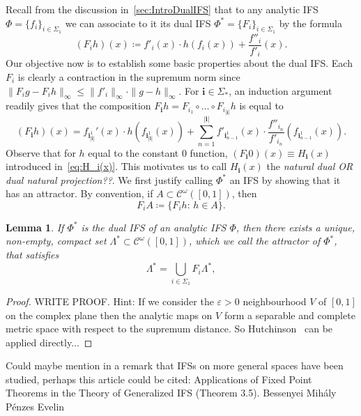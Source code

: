 \documentclass[12pt,]{article}
\newtheorem{lemma}[theorem]{Lemma}
\theoremstyle{definition}
\theoremstyle{remark}
\newcommand{\0}{\mathbf{0}}
\newcommand{\bi}{\mathbf{i}}
\begin{document}
{Recall from the discussion in~\cref{sec:IntroDualIFS} that to any analytic IFS $\Phi=\{f_i\}_{i\in\Sigma_1}$ we can associate to it its dual IFS $\Phi^*=\{F_i\}_{i\in\Sigma_1}$ by the formula
\begin{equation}\label{eq:LiftedIFS}
	(F_i h)(x)\coloneqq f'_i(x)\cdot h(f_i(x)) + \frac{f''_i}{f'_i}(x).
\end{equation}
Our objective now is to establish some basic properties about the dual IFS. Each $F_i$ is clearly a contraction in the supremum norm since $\|F_ig-F_ih\|_{\infty}\leq \|f'_i\|_{\infty}\cdot \|g-h\|_{\infty}$. For $\bi\in\Sigma_*$, an induction argument readily gives that the composition $F_{\bi}h=F_{i_1}\circ\ldots\circ F_{i_{|\bi|}}h$ is equal to
\begin{equation}\label{eq:IteratesLiftedIFS}
	(F_{\bi}h)(x) = f_{\bi_{|\bi|}^1}'(x)\cdot h(f_{\bi_{|\bi|}^1}(x)) + \sum_{n=1}^{|\bi|} f'_{\bi_{n-1}^1}(x) \cdot 
	\frac{f''_{i_n}}{f'_{i_n}}(f_{\bi_{n-1}^1}(x)).
\end{equation}
Observe that for $h$ equal to the constant $0$ function, $(F_{\bi}0)(x)\equiv H_{\bi}(x)$ introduced in~\cref{eq:H_i(x)}. This motivates us to call $H_{\bi}(x)$ the {\color{red} \emph{natural dual OR dual natural projection??}.} We first justify calling $\Phi^*$ an IFS by showing that it has an attractor. By convention, if $A\subset \mathcal{C}^{\omega}([0,1])$, then
\begin{equation*}
F_iA \coloneqq \{F_i h:\, h\in A\}.
\end{equation*}
\begin{lemma}\label{lem:ExistanceAttractor}
If $\Phi^*$ is the dual IFS of an analytic IFS $\Phi$, then there exists a unique, non-empty, compact set $\Lambda^*\subset \mathcal{C}^{\omega}([0,1])$, which we call the \emph{attractor} of $\Phi^*$, that satisfies
\begin{equation*}
\Lambda^*=\bigcup_{i\in\Sigma_1} F_i\Lambda^*,
\end{equation*} 
\end{lemma} 
\begin{proof}
{\color{red} WRITE PROOF. Hint: If we consider the $\varepsilon>0$ neighbourhood $V$ of $[0,1]$ on the complex plane then the analytic maps on $V$ form a separable and complete metric space with respect to the supremum distance. So Hutchinson~\cite{Hutchinson_Attractor_81} can be applied directly...}
\end{proof}

{\color{red} Could maybe mention in a remark that IFSs on more general spaces have been studied, perhaps this article could be cited: Applications of Fixed Point Theorems in the Theory of Generalized IFS (Theorem 3.5). Bessenyei Mih\'aly  P\'enzes Evelin}

}
\end{document}
